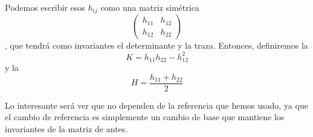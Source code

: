 Podemos escribir esos $h_{ij}$ como una matriz simétrica \[ \begin{pmatrix} h_{11} & h_{12} \\ h_{12} & h_{22}\end{pmatrix} \], que tendrá como invariantes el determinante y la traza. Entonces, definiremos la  \[ K = h_{11} h_{22} - h_{12}^2 \] y la  \[ H = \frac{h_{11} + h_{22}}{2} \]

Lo interesante será ver que no dependen de la referencia que hemos usado, ya que el cambio de referencia es simplemente un cambio de base que mantiene los invariantes de la matriz de antes.
